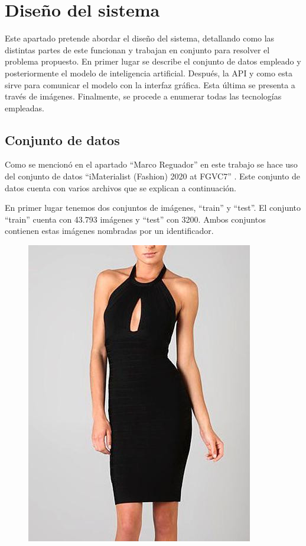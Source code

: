 \documentclass[12pt]{report} %
\begin{document}
	\chapter{Diseño del sistema}
	Este apartado pretende abordar el diseño del sistema, detallando como las distintas partes de este funcionan y trabajan en conjunto para
	resolver el problema propuesto. En primer lugar se describe el conjunto de datos empleado y posteriormente el modelo de inteligencia artificial.
	Después, la API y como esta sirve para comunicar el modelo con la interfaz gráfica. Esta última se presenta a través de imágenes. Finalmente, se procede
	a enumerar todas las tecnologías empleadas.
	\section{Conjunto de datos}
	Como se mencionó en el apartado ``Marco Reguador'' en este trabajo se hace uso del conjunto de datos 
	``iMaterialist (Fashion) 2020 at FGVC7'' \cite{imaterialist}. Este conjunto de datos cuenta con varios archivos que se 
	explican a continuación.

	En primer lugar tenemos dos conjuntos de imágenes, ``train'' y ``test''. El conjunto ``train'' cuenta con 43.793 imágenes
	y ``test'' con 3200. Ambos conjuntos contienen estas imágenes nombradas por un identificador.
	\begin{figure}[H]
		{\includegraphics[scale=0.4]{ejemplo-dataset.jpg}}
	\end{figure}
\end{document}

